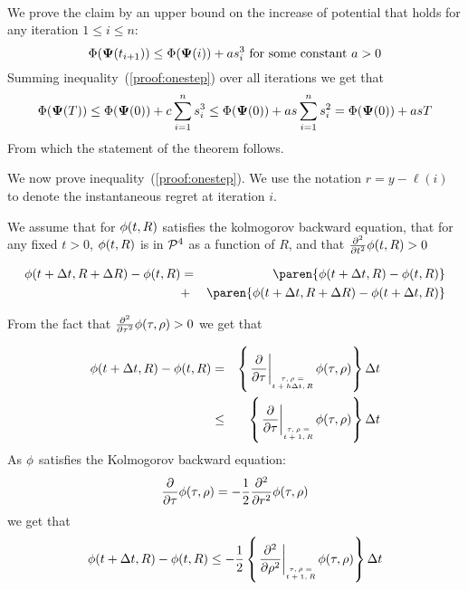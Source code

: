 \documentclass{article}[12pt]
\begin{document}
{\\
We prove the claim by an upper bound on the increase of potential that holds for any iteration $1 \leq i \leq n$:
\begin{equation} \label{proof:onestep}
\Phi({\bf \Psi}(t_{i+1})) \leq \Phi({\bf \Psi}(i)) + a s_i^3 \mbox{ for some constant } a>0
\end{equation}
Summing inequality~(\ref{proof:onestep}) over all iterations we get that 
\begin{equation} \label{proof:allsteps}
\Phi({\bf \Psi}(T)) \leq \Phi({\bf \Psi}(0)) + c \sum_{i=1}^n s_i^3 \leq 
\Phi({\bf \Psi}(0)) + a s \sum_{i=1}^n s_i^2 = 
\Phi({\bf \Psi}(0)) + a s T
\end{equation}
From which the statement of the theorem follows.

We now prove inequality~(\ref{proof:onestep}). 
We use the notation $r=y -\ell(i)$ to denote the instantaneous regret at iteration $i$. 
\fi



We assume that for $\phi(t,R)$ satisfies the kolmogorov backward equation,
that for any fixed $t>0$, $\phi(t,R)$ is in ${\cal P}^{4}$ as a function of $R$, and that
$\frac{\partial^2}{\partial t^2} \phi(t,R) > 0$


\begin{eqnarray} 
  \pot(t+\deltat,\R+\deltaR) - \pot(t,\R)
  &=& \paren{\pot(t+\deltat,\R) - \pot(t,\R)} \nonumber\\
  &+& \paren{\pot(t+\deltat,\R+\deltaR)-\pot(t+\deltat,\R)} \label{eqn:diffs}
\end{eqnarray}

From the fact that $\frac{\partial^2}{\partial \tau^2} \phi(\tau,\rho) > 0$ we get that 

\begin{eqnarray}
\pot(t+\deltat,\R) - \pot(t,\R) &=& \at{\frac{\partial}{\partial \tau}}{t+h\deltat,R}  \deltat \nonumber \\
  & \leq & \at{\frac{\partial}{\partial \tau}}{t+1,R}  \deltat \label{eqn:interior-point-dt}
\end{eqnarray}
As $\phi$ satisfies the Kolmogorov backward equation:
\begin{equation*} 
  \frac{\partial}{\partial \tau} \phi(\tau,\rho)
  = -\frac{1}{2} \frac{\partial^2}{\partial r^2} \phi(\tau,\rho)
\end{equation*}
we get that
\begin{equation}
  \pot(t+\deltat,\R) - \pot(t,\R) \leq
  -\frac{1}{2} \at{\frac{\partial^2}{\partial \rho^2}}{t+1,R} \deltat
  \label{eqn:usingKol}
\end{equation}

}
\end{document}
